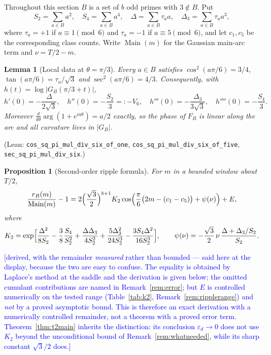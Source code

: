 \documentclass[11pt,a4paper]{article}
\theoremstyle{plain}
\newtheorem{proposition}[theorem]{Proposition}
\newtheorem{lemma}[theorem]{Lemma}
\theoremstyle{definition}
\theoremstyle{remark}
\newcommand{\Lean}[1]{\texttt{#1}}
\newcommand{\STATUS}[1]{\textcolor{blue}{\textsf{[#1]}}}
\DeclareMathOperator{\Main}{Main}
\begin{document}
Throughout this section $B$ is a set of $b$ odd primes with $3\notin B$. Put
\[
  S_2=\sum_{a\in B}a^{2},\quad S_4=\sum_{a\in B}a^{4},\quad
  \Delta=\sum_{a\in B}\tau_a a,\quad \Delta_3=\sum_{a\in B}\tau_a a^{3},
\]
where $\tau_a=+1$ if $a\equiv1\pmod6$ and $\tau_a=-1$ if $a\equiv5\pmod 6$, and
let $c_1,c_5$ be the corresponding class counts. Write $\Main(m)$ for the
Gaussian main-arc term and $\nu=T/2-m$.

\begin{lemma}[Local data at $\theta=\pi/3$]\label{lem:local}
Every $a\in B$ satisfies $\cos^{2}(a\pi/6)=3/4$, $\tan(a\pi/6)=\tau_a/\sqrt3$
and $\sec^{2}(a\pi/6)=4/3$. Consequently, with
$h(t)=\log|G_B(\pi/3+t)|$,
\[
  h'(0)=-\frac{\Delta}{2\sqrt3},\quad h''(0)=-\frac{S_2}{3}=:-V_6,\quad
  h'''(0)=-\frac{\Delta_3}{3\sqrt3},\quad h''''(0)=-\frac{S_4}{3}.
\]
Moreover $\frac{d}{d\theta}\arg(1+e^{ia\theta})=a/2$ exactly, so the phase of
$F_B$ is linear along the arc and all curvature lives in $|G_B|$.
\end{lemma}

\noindent
(Lean: \Lean{cos\_sq\_pi\_mul\_div\_six\_of\_one},
\Lean{cos\_sq\_pi\_mul\_div\_six\_of\_five}, \Lean{sec\_sq\_pi\_mul\_div\_six}.)

\begin{proposition}[Second-order ripple formula]\label{prop:ripple}
For $m$ in a bounded window about $T/2$,
\[
  \frac{r_B(m)}{\Main(m)}-1
  =2\Bigl(\frac{\sqrt3}{2}\Bigr)^{b+1}K_2
   \cos\Bigl(\frac{\pi}{6}\bigl(2m-(c_1-c_5)\bigr)+\psi(\nu)\Bigr)+E,
\]
where
\begin{equation}\label{eq:k2}
  K_2=\exp\Bigl[\frac{\Delta^{2}}{8S_2}-\frac38\frac{S_4}{S_2^{2}}
      +\frac{\Delta\Delta_3}{4S_2^{2}}+\frac{5\Delta_3^{2}}{24S_2^{3}}
      -\frac{3S_4\Delta^{2}}{16S_2^{3}}\Bigr],
  \qquad
  \psi(\nu)=-\frac{\sqrt3}{2}\,\nu\,\frac{\Delta+\Delta_3/S_2}{S_2}.
\end{equation}
\end{proposition}

\STATUS{derived, with the remainder \emph{measured} rather than bounded --- said here at the
display, because the two are easy to confuse. The equality is obtained by Laplace's method at
the saddle and the derivation is given below; the omitted cumulant contributions are named in
Remark~\ref{rem:error}; but $E$ is controlled numerically on the tested range
(Table~\ref{tab:k2}, Remark~\ref{rem:ripplerange}) and \emph{not} by a proved asymptotic
bound. This is therefore an exact derivation with a numerically controlled remainder, not a
theorem with a proved error term. Theorem~\ref{thm:t2main} inherits the distinction: its
conclusion $\varepsilon_d\to0$ does not use $K_2$ beyond the unconditional bound of
Remark~\ref{rem:whatneeded}, while its sharp constant $\sqrt3/2$ does.}
\end{document}
